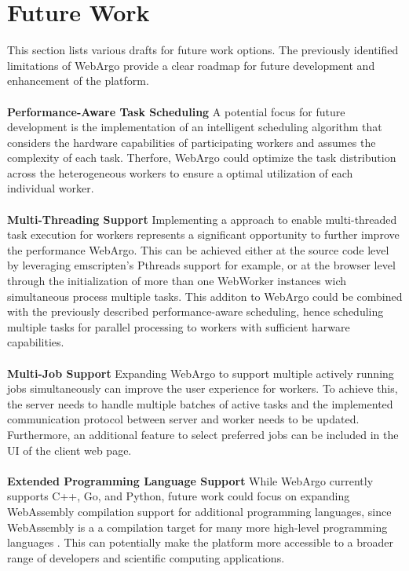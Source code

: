 \section{Future Work}
\label{sec:conclusion:future_work}
This section lists various drafts for future work options. The previously identified limitations of WebArgo provide a clear roadmap for future development and enhancement of the platform.  
\\~\\
\textbf{Performance-Aware Task Scheduling}
\newline
A potential focus for future development is the implementation of an intelligent scheduling algorithm that considers the hardware capabilities of participating workers and assumes the complexity of each task. Therfore, WebArgo could optimize the task distribution across the heterogeneous workers to ensure a optimal utilization of each individual worker.
\\~\\
\textbf{Multi-Threading Support}
\newline
Implementing a approach to enable multi-threaded task execution for workers represents a significant opportunity to further improve the performance WebArgo. This can be achieved either at the source code level by leveraging emscripten's Pthreads support \cite{methodology:emcc} for example, or at the browser level through the initialization of more than one WebWorker instances wich simultaneous process multiple tasks. This additon to WebArgo could be combined with the previously described performance-aware scheduling, hence scheduling multiple tasks for parallel processing to workers with sufficient harware capabilities.
\\~\\
\textbf{Multi-Job Support}
Expanding WebArgo to support multiple actively running jobs simultaneously can improve the user experience for workers. To achieve this, the server needs to handle multiple batches of active tasks and the implemented communication protocol between server and worker needs to be updated. Furthermore, an additional feature to select preferred jobs can be included in the \ac{UI} of the client web page.  
\\~\\
\textbf{Extended Programming Language Support}
While WebArgo currently supports C++, Go, and Python, future work could focus on expanding WebAssembly compilation support for additional programming languages, since WebAssembly is a a compilation target for many more high-level programming languages \cite{methodology:wasm, methodology:wasmW3C, methodology:wasm2}. This can potentially make the platform more accessible to a broader range of developers and scientific computing applications.
